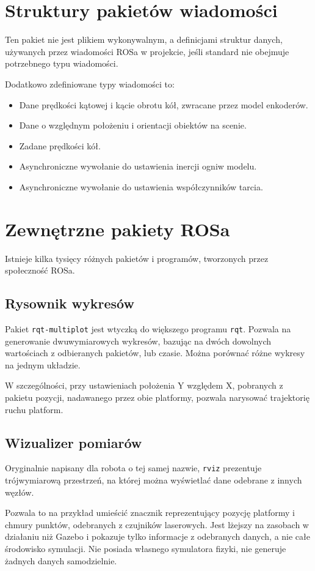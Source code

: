 \section{Struktury pakietów wiadomości}
	Ten pakiet nie jest plikiem wykonywalnym, a definicjami struktur danych, używanych przez wiadomości ROSa w projekcie, jeśli 
	standard nie obejmuje potrzebnego typu wiadomości.
	
	Dodatkowo zdefiniowane typy wiadomości to:
	\begin{itemize}
		\item Dane prędkości kątowej i kącie obrotu kół, zwracane przez model enkoderów.
		\item Dane o względnym położeniu i orientacji obiektów na scenie.
		\item Zadane prędkości kół.
		\item Asynchroniczne wywołanie do ustawienia inercji ogniw modelu.
		\item Asynchroniczne wywołanie do ustawienia współczynników tarcia.
	\end{itemize}

\section{Zewnętrzne pakiety ROSa}
	Istnieje kilka tysięcy różnych pakietów i programów, tworzonych przez społeczność ROSa.
	
	\subsection{Rysownik wykresów}
		Pakiet \texttt{rqt-multiplot} jest wtyczką do większego programu \texttt{rqt}.
		Pozwala na generowanie dwuwymiarowych wykresów, bazując na dwóch dowolnych wartościach z odbieranych pakietów, lub czasie.
		Można porównać różne wykresy na jednym układzie.
		
		W szczególności, przy ustawieniach położenia Y względem X, pobranych z pakietu pozycji, nadawanego przez obie platformy, pozwala narysować trajektorię ruchu platform.
		
	\subsection{Wizualizer pomiarów}
		Oryginalnie napisany dla robota o tej samej nazwie, \texttt{rviz} prezentuje trójwymiarową przestrzeń, na której można wyświetlać 
		dane odebrane z innych węzłów.
		
		Pozwala to na przykład umieścić znacznik reprezentujący pozycję platformy i chmury punktów, odebranych z czujników laserowych.
		Jest lżejszy na zasobach w działaniu niż Gazebo i pokazuje tylko informacje z odebranych danych, a nie całe środowisko symulacji.
		Nie posiada własnego symulatora fizyki, nie generuje żadnych danych samodzielnie.
		

